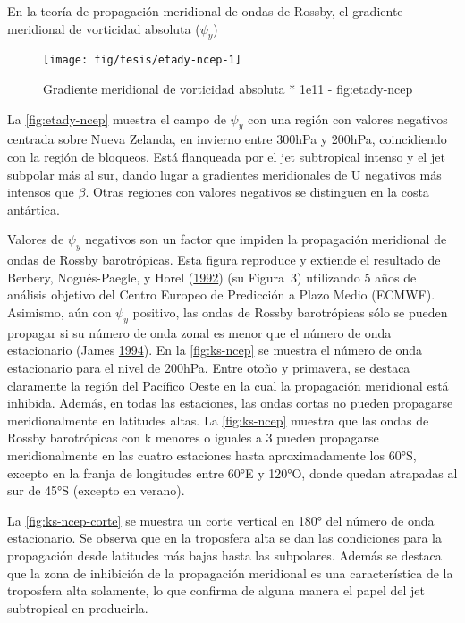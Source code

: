 \documentclass[spanish,a4paper]{book}
\begin{document}
En la teoría de propagación meridional de ondas de Rossby, el gradiente
meridional de vorticidad absoluta (\(\psi_y\))

\begin{landscape}\begin{figure}

{\centering \texttt{[image: fig/tesis/etady-ncep-1]} 

}

\caption{Gradiente meridional de vorticidad absoluta * 1e11 - fig:etady-ncep}\label{fig:etady-ncep}
\end{figure}
\end{landscape}

La \autoref{fig:etady-ncep} muestra el campo de \(\psi_y\) con una
región con valores negativos centrada sobre Nueva Zelanda, en invierno
entre 300hPa y 200hPa, coincidiendo con la región de bloqueos. Está
flanqueada por el jet subtropical intenso y el jet subpolar más al sur,
dando lugar a gradientes meridionales de U negativos más intensos que
\(\beta\). Otras regiones con valores negativos se distinguen en la
costa antártica.

Valores de \(\psi_y\) negativos son un factor que impiden la propagación
meridional de ondas de Rossby barotrópicas. Esta figura reproduce y
extiende el resultado de Berbery, Nogués-Paegle, y Horel
(\protect\hyperlink{ref-Berbery1992}{1992}) (su Figura~3) utilizando 5
años de análisis objetivo del Centro Europeo de Predicción a Plazo Medio
(ECMWF). Asimismo, aún con \(\psi_y\) positivo, las ondas de Rossby
barotrópicas sólo se pueden propagar si su número de onda zonal es menor
que el número de onda estacionario (James
\protect\hyperlink{ref-James}{1994}). En la \autoref{fig:ks-ncep} se
muestra el número de onda estacionario para el nivel de 200hPa. Entre
otoño y primavera, se destaca claramente la región del Pacífico Oeste en
la cual la propagación meridional está inhibida. Además, en todas las
estaciones, las ondas cortas no pueden propagarse meridionalmente en
latitudes altas. La \autoref{fig:ks-ncep} muestra que las ondas de
Rossby barotrópicas con k menores o iguales a 3 pueden propagarse
meridionalmente en las cuatro estaciones hasta aproximadamente los 60°S,
excepto en la franja de longitudes entre 60°E y 120°O, donde quedan
atrapadas al sur de 45°S (excepto en verano).

La \autoref{fig:ks-ncep-corte} se muestra un corte vertical en 180° del
número de onda estacionario. Se observa que en la troposfera alta se dan
las condiciones para la propagación desde latitudes más bajas hasta las
subpolares. Además se destaca que la zona de inhibición de la
propagación meridional es una característica de la troposfera alta
solamente, lo que confirma de alguna manera el papel del jet subtropical
en producirla.
\end{document}
